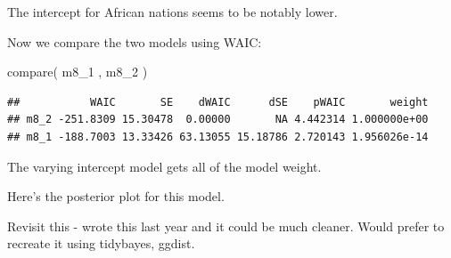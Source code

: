\documentclass[
]{book}
\newenvironment{Shaded}{\begin{snugshade}}{\end{snugshade}}
\newcommand{\FunctionTok}[1]{\textcolor[rgb]{0.00,0.00,0.00}{#1}}
\newcommand{\NormalTok}[1]{#1}
\begin{document}
The intercept for African nations seems to be notably lower.

Now we compare the two models using WAIC:

\begin{Shaded}
\begin{Highlighting}[]
\FunctionTok{compare}\NormalTok{( m8\_1 , m8\_2 )}
\end{Highlighting}
\end{Shaded}

\begin{verbatim}
##           WAIC       SE    dWAIC      dSE    pWAIC       weight
## m8_2 -251.8309 15.30478  0.00000       NA 4.442314 1.000000e+00
## m8_1 -188.7003 13.33426 63.13055 15.18786 2.720143 1.956026e-14
\end{verbatim}

The varying intercept model gets all of the model weight.

Here's the posterior plot for this model.

Revisit this - wrote this last year and it could be much cleaner. Would prefer to recreate it using tidybayes, ggdist.
\end{document}
